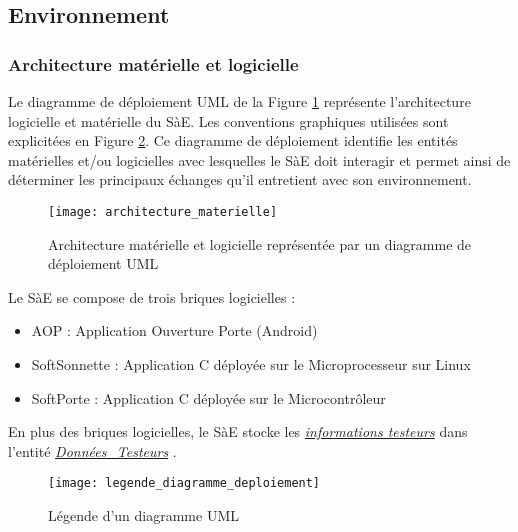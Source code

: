 \newpage
\subsection{Environnement}

\subsubsection{Architecture matérielle et logicielle}

Le diagramme de déploiement UML de la Figure \ref{ArchitectureMaterielle} représente l’architecture logicielle et matérielle du SàE.
Les conventions graphiques utilisées sont explicitées en Figure \ref{LegendeDiagrammeDeploiement}.
Ce diagramme de déploiement identifie les entités matérielles et/ou logicielles avec lesquelles le SàE doit interagir et permet ainsi de déterminer les principaux échanges qu’il entretient avec son environnement.\\

\begin{figure} [H]
    \centering
    \texttt{[image: architecture\_materielle]}
    \caption{Architecture matérielle et logicielle représentée par un diagramme de déploiement UML}
    \label{ArchitectureMaterielle}
\end{figure}

Le SàE se compose de trois briques logicielles :
\begin{itemize}
    \item AOP : Application Ouverture Porte (Android)
    \item SoftSonnette : Application C déployée sur le Microprocesseur sur Linux
    \item SoftPorte : Application C déployée sur le Microcontrôleur\\
\end{itemize}

En plus des briques logicielles, le SàE stocke les \hyperlink{caracEmploye}{\textit{informations testeurs}} dans l'entité \hyperlink{donneesTesteurs}{\textit{Données\_Testeurs}} .

\begin{figure} [H]
    \centering
    \texttt{[image: legende\_diagramme\_deploiement]}
    \caption{Légende d'un diagramme UML}
    \label{LegendeDiagrammeDeploiement}
\end{figure}

